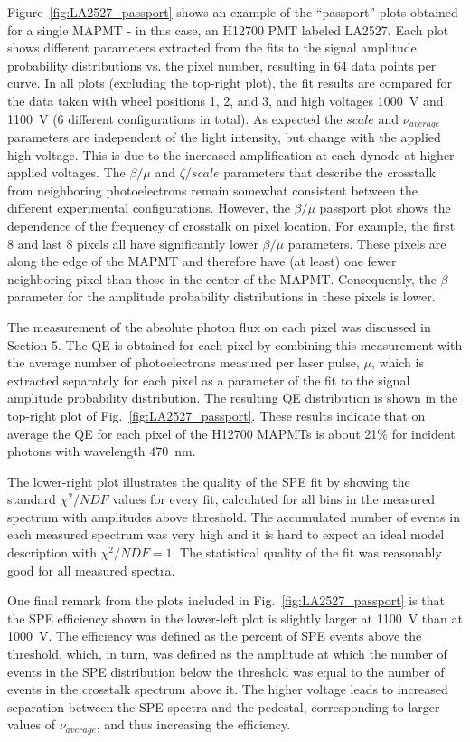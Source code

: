 Figure~\ref{fig:LA2527_passport} shows an example of the ``passport'' plots obtained for a single MAPMT - in this case, an H12700 PMT labeled LA2527. 
Each plot shows different parameters extracted from the fits to the signal amplitude probability distributions vs. the pixel number, resulting in 64 data points per curve.
In all plots (excluding the top-right plot), the fit results are compared for the data taken with wheel positions 1, 2, and 3, and high voltages 1000~V and 1100~V (6 different configurations in total).
As expected the $scale$ and $\nu_{average}$ parameters are independent of the light intensity, but change with the applied high voltage. 
This is due to the increased amplification at each dynode at higher applied voltages.
The $\beta/\mu$ and $\zeta/scale$ parameters that describe the crosstalk from neighboring photoelectrons remain somewhat consistent between the different experimental configurations. 
However, the $\beta/\mu$ passport plot shows the dependence of the frequency of crosstalk on pixel location. For example, the first 8 and last 8 pixels all have significantly lower $\beta/\mu$ parameters. These pixels are along the edge of the MAPMT and therefore have (at least) one fewer neighboring pixel than those in the center of the MAPMT.
Consequently, the $\beta$ parameter for the amplitude probability distributions in these pixels is lower. 

The measurement of the absolute photon flux on each pixel was discussed in Section 5. The QE is obtained for each pixel by combining this measurement with the average number of photoelectrons measured per laser pulse, $\mu$, which is extracted separately for each pixel as a parameter of the fit to the signal amplitude probability distribution. The resulting QE distribution is shown in the top-right plot of Fig.~\ref{fig:LA2527_passport}. These results indicate that on average the QE for each pixel of the H12700 MAPMTs is about 21$\%$ for incident photons with wavelength 470~nm.

The lower-right plot illustrates the quality of the SPE fit by showing the standard $\chi^2/NDF$ values for every fit, calculated for all bins in the measured spectrum with amplitudes above threshold. The accumulated number of events in each measured spectrum was very high and it is hard to expect an ideal model description with $\chi^2/NDF = 1$. The statistical quality of the fit was reasonably good for all measured spectra.

One final remark from the plots included in Fig.~\ref{fig:LA2527_passport} is that the SPE efficiency shown in the lower-left plot is slightly larger at 1100~V than at 1000~V. The efficiency was defined as the percent of SPE events above the threshold, which, in turn, was defined as the amplitude at which the number of events in the SPE distribution below the threshold was equal to the number of events in the crosstalk spectrum above it. The higher voltage leads to increased separation between the SPE spectra and the pedestal, corresponding to larger values of $\nu_{average}$, and thus increasing the efficiency. 

